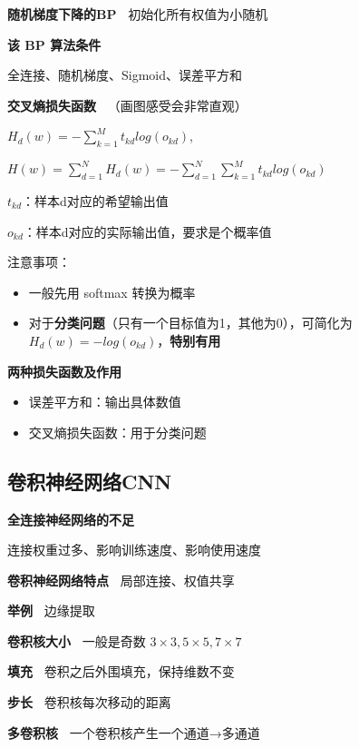 \documentclass[b4paper, 10pt]{ctexart}
\begin{document}
\begin{multicols}{3}
\textbf{随机梯度下降的BP\ } 初始化所有权值为小随机

\textbf{该 BP 算法条件\ } 

全连接、随机梯度、Sigmoid、误差平方和

\textbf{交叉熵损失函数\ } （画图感受会非常直观）

$H_d(w)=-\sum_{k=1}^M t_{kd} log(o_{kd})$, 

$H(w) = \sum_{d=1}^N H_d(w) = -\sum_{d=1}^N\sum_{k=1}^M t_{kd} log(o_{kd})$

$t_{kd}$：样本d对应的希望输出值

$o_{kd}$：样本d对应的实际输出值，要求是个概率值

注意事项：
\begin{itemize}
    \item 一般先用 softmax 转换为概率
    \item 对于\textbf{分类问题}（只有一个目标值为1，其他为0），可简化为 $H_d(w) = -log(o_{kd})$，\textbf{特别有用}
\end{itemize}

\textbf{两种损失函数及作用}
\begin{itemize}
    \item 误差平方和：输出具体数值
    \item 交叉熵损失函数：用于分类问题
\end{itemize}

\subsection{卷积神经网络CNN}
\textbf{全连接神经网络的不足\ } 

连接权重过多、影响训练速度、影响使用速度


\textbf{卷积神经网络特点\ } 局部连接、权值共享

\textbf{举例\ } 边缘提取

\textbf{卷积核大小\ } 一般是奇数 $3\times 3, 5\times 5, 7\times 7$

\textbf{填充\ } 卷积之后外围填充，保持维数不变

\textbf{步长\ } 卷积核每次移动的距离

\textbf{多卷积核\ } 一个卷积核产生一个通道→多通道


\end{multicols}
\end{document}
